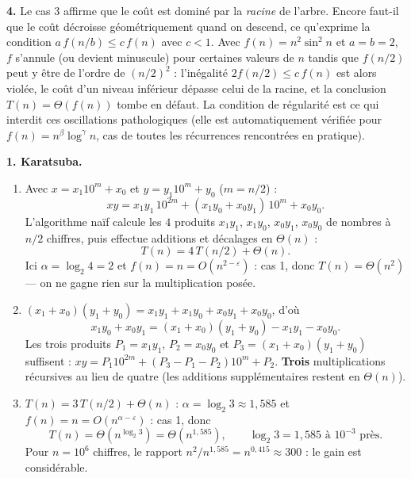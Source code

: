 \documentclass[11pt,a4paper]{article}
\begin{document}
\textbf{4.} Le cas 3 affirme que le coût est dominé par la \emph{racine} de l'arbre.
Encore faut-il que le coût décroisse géométriquement quand on descend, ce qu'exprime
la condition $a\,f(n/b)\le c\,f(n)$ avec $c<1$. Avec $f(n)=n^{2}\sin^{2}n$ et $a=b=2$,
$f$ s'annule (ou devient minuscule) pour certaines valeurs de $n$ tandis que
$f(n/2)$ peut y être de l'ordre de $(n/2)^{2}$ : l'inégalité
$2f(n/2)\le c\,f(n)$ est alors violée, le coût d'un niveau inférieur dépasse celui de la
racine, et la conclusion $T(n)=\Theta(f(n))$ tombe en défaut. La condition de régularité
est ce qui interdit ces oscillations pathologiques (elle est automatiquement vérifiée
pour $f(n)=n^{\beta}\log^{\gamma}n$, cas de toutes les récurrences rencontrées en
pratique).

\reponse
\textbf{1. Karatsuba.}
\begin{enumerate}[label=(\alph*),leftmargin=*,itemsep=4pt]
  \item Avec $x=x_1 10^{m}+x_0$ et $y=y_1 10^{m}+y_0$ ($m=n/2$) :
        \[
          xy = x_1y_1\,10^{2m} + (x_1y_0+x_0y_1)\,10^{m} + x_0y_0 .
        \]
        L'algorithme naïf calcule les $4$ produits $x_1y_1$, $x_1y_0$, $x_0y_1$,
        $x_0y_0$ de nombres à $n/2$ chiffres, puis effectue additions et décalages en
        $\Theta(n)$ :
        \[
          T(n)=4\,T(n/2)+\Theta(n).
        \]
        Ici $\alpha=\log_2 4 = 2$ et $f(n)=n=O(n^{2-\varepsilon})$ : cas 1, donc
        $T(n)=\Theta(n^{2})$ --- on ne gagne rien sur la multiplication posée.
  \item $(x_1+x_0)(y_1+y_0) = x_1y_1 + x_1y_0 + x_0y_1 + x_0y_0$, d'où
        \[
          x_1y_0+x_0y_1 = (x_1+x_0)(y_1+y_0) - x_1y_1 - x_0y_0 .
        \]
        Les trois produits $P_1=x_1y_1$, $P_2=x_0y_0$ et $P_3=(x_1+x_0)(y_1+y_0)$
        suffisent : $xy = P_1 10^{2m} + (P_3-P_1-P_2)10^{m}+P_2$.
        \textbf{Trois} multiplications récursives au lieu de quatre (les additions
        supplémentaires restent en $\Theta(n)$).
  \item $T(n)=3\,T(n/2)+\Theta(n)$ : $\alpha=\log_2 3\approx 1{,}585$ et
        $f(n)=n=O(n^{\alpha-\varepsilon})$ : cas 1, donc
        \[
          \boxed{T(n)=\Theta\!\left(n^{\log_2 3}\right)=\Theta\!\left(n^{1{,}585}\right)},
          \qquad \log_2 3 = 1{,}585 \text{ à } 10^{-3} \text{ près}.
        \]
        Pour $n=10^{6}$ chiffres, le rapport $n^{2}/n^{1,585}=n^{0,415}\approx 300$ :
        le gain est considérable.
\end{enumerate}
\end{document}
